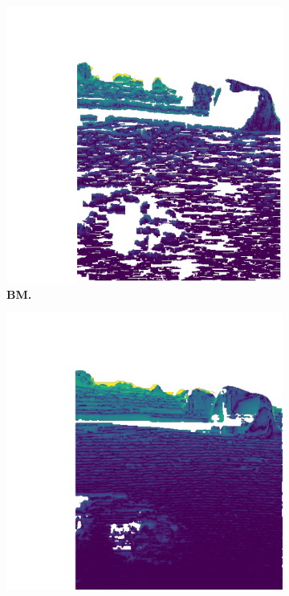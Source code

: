 \begin{figure}[b!]
\begin{subfigure}[b]{0.16\textwidth}
		\includegraphics[width=\textwidth]{figures/depth_error_BM.png}
		\caption{\bfseries BM.}
	\end{subfigure}\hfill
	\begin{subfigure}[b]{0.16\textwidth}
		\includegraphics[width=\textwidth]{figures/depth_error_SGBM.png}

\end{subfigure}
\end{figure}
